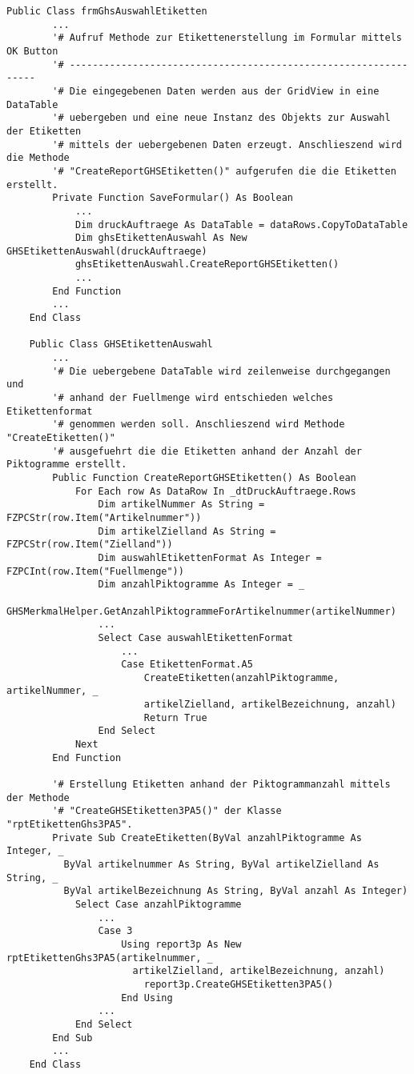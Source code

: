 \begin{lstlisting}[style=A, caption=Auszug Routine Etikettenerstellung (.NET),
label={code:etiketten}]
    Public Class frmGhsAuswahlEtiketten
        ...
        '# Aufruf Methode zur Etikettenerstellung im Formular mittels OK Button
        '# ----------------------------------------------------------------
        '# Die eingegebenen Daten werden aus der GridView in eine DataTable 
        '# uebergeben und eine neue Instanz des Objekts zur Auswahl der Etiketten
        '# mittels der uebergebenen Daten erzeugt. Anschlieszend wird die Methode 
        '# "CreateReportGHSEtiketten()" aufgerufen die die Etiketten erstellt. 
        Private Function SaveFormular() As Boolean
            ...
            Dim druckAuftraege As DataTable = dataRows.CopyToDataTable
            Dim ghsEtikettenAuswahl As New GHSEtikettenAuswahl(druckAuftraege)
            ghsEtikettenAuswahl.CreateReportGHSEtiketten() 
            ...
        End Function
        ...
    End Class
    
    Public Class GHSEtikettenAuswahl
        ...
        '# Die uebergebene DataTable wird zeilenweise durchgegangen und
        '# anhand der Fuellmenge wird entschieden welches Etikettenformat
        '# genommen werden soll. Anschlieszend wird Methode "CreateEtiketten()"
        '# ausgefuehrt die die Etiketten anhand der Anzahl der Piktogramme erstellt.
        Public Function CreateReportGHSEtiketten() As Boolean
            For Each row As DataRow In _dtDruckAuftraege.Rows
                Dim artikelNummer As String = FZPCStr(row.Item("Artikelnummer"))
                Dim artikelZielland As String = FZPCStr(row.Item("Zielland"))
                Dim auswahlEtikettenFormat As Integer = FZPCInt(row.Item("Fuellmenge"))
                Dim anzahlPiktogramme As Integer = _
                GHSMerkmalHelper.GetAnzahlPiktogrammeForArtikelnummer(artikelNummer)
                ...
                Select Case auswahlEtikettenFormat
                    ...
                    Case EtikettenFormat.A5
                        CreateEtiketten(anzahlPiktogramme, artikelNummer, _
                        artikelZielland, artikelBezeichnung, anzahl)
                        Return True
                End Select
            Next
        End Function
    
        '# Erstellung Etiketten anhand der Piktogrammanzahl mittels der Methode
        '# "CreateGHSEtiketten3PA5()" der Klasse "rptEtikettenGhs3PA5".
        Private Sub CreateEtiketten(ByVal anzahlPiktogramme As Integer, _
          ByVal artikelnummer As String, ByVal artikelZielland As String, _
          ByVal artikelBezeichnung As String, ByVal anzahl As Integer)
            Select Case anzahlPiktogramme
                ...
                Case 3
                    Using report3p As New rptEtikettenGhs3PA5(artikelnummer, _
                      artikelZielland, artikelBezeichnung, anzahl)
                        report3p.CreateGHSEtiketten3PA5()
                    End Using
                ...
            End Select
        End Sub
        ...
    End Class


\end{lstlisting}
